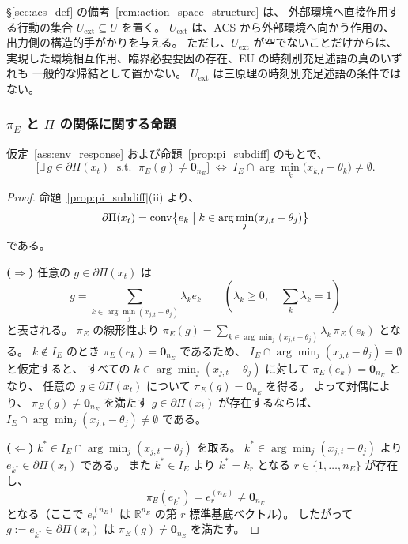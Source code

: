 \begin{remark}
\label{rem:u_ext_output_cue}
\S\ref{sec:acs_def} の備考~\ref{rem:action_space_structure} は、
外部環境へ直接作用する行動の集合 $U_{\mathrm{ext}}\subseteq U$ を置く。
$U_{\mathrm{ext}}$ は、ACS から外部環境へ向かう作用の、
出力側の構造的手がかりを与える。
ただし、$U_{\mathrm{ext}}$ が空でないことだけからは、
実現した環境相互作用、臨界必要要因の存在、EU の時刻別充足述語の真のいずれも
一般的な帰結として置かない。
$U_{\mathrm{ext}}$ は三原理の時刻別充足述語の条件ではない。
\end{remark}

\subsubsection{$\pi_E$ と $\Pi$ の関係に関する命題}

\begin{proposition}
\label{prop:pi_E_sensitivity}
仮定~\ref{ass:env_response} および命題~\ref{prop:pi_subdiff} のもとで、
\[
  \bigl[\exists\,g\in\partial\Pi(x_t)\;\text{ s.t. }\;\pi_E(g)\neq\mathbf{0}_{n_E}\bigr]
  \;\iff\;
  I_E\cap\arg\min_k\bigl(x_{k,t}-\theta_k\bigr)\neq\emptyset.
\]
\end{proposition}

\begin{proof}
命題~\ref{prop:pi_subdiff}(ii) より、
\[
  \partial\Pi(x_t)
  =
  \operatorname{conv}
  \bigl\{
    e_k
    \bigm|
    k\in\arg\min_j(x_{j,t}-\theta_j)
  \bigr\}
\]
である。

\textbf{($\Rightarrow$)}\;
任意の $g\in\partial\Pi(x_t)$ は
\[
  g
  =
  \sum_{k\in\arg\min_j(x_{j,t}-\theta_j)}
  \lambda_k e_k
  \qquad
  (\lambda_k\ge0,\quad \textstyle\sum_k\lambda_k=1)
\]
と表される。
$\pi_E$ の線形性より
$\pi_E(g)=\sum_{k\in\arg\min_j(x_{j,t}-\theta_j)}\lambda_k\,\pi_E(e_k)$
となる。
$k\notin I_E$ のとき $\pi_E(e_k)=\mathbf{0}_{n_E}$ であるため、
$I_E\cap\arg\min_j(x_{j,t}-\theta_j)=\emptyset$ と仮定すると、
すべての $k\in\arg\min_j(x_{j,t}-\theta_j)$ に対して
$\pi_E(e_k)=\mathbf{0}_{n_E}$ となり、
任意の $g\in\partial\Pi(x_t)$ について
$\pi_E(g)=\mathbf{0}_{n_E}$ を得る。
よって対偶により、
$\pi_E(g)\neq\mathbf{0}_{n_E}$ を満たす
$g\in\partial\Pi(x_t)$ が存在するならば、
$I_E\cap\arg\min_j(x_{j,t}-\theta_j)\neq\emptyset$ である。

\textbf{($\Leftarrow$)}\;
$k^*\in I_E\cap\arg\min_j(x_{j,t}-\theta_j)$ を取る。
$k^*\in\arg\min_j(x_{j,t}-\theta_j)$ より
$e_{k^*}\in\partial\Pi(x_t)$ である。
また $k^*\in I_E$ より $k^*=k_r$ となる
$r\in\{1,\ldots,n_E\}$ が存在し、
\[
  \pi_E(e_{k^*})
  =
  e_r^{(n_E)}
  \neq
  \mathbf{0}_{n_E}
\]
となる（ここで $e_r^{(n_E)}$ は
$\mathbb{R}^{n_E}$ の第 $r$ 標準基底ベクトル）。
したがって $g:=e_{k^*}\in\partial\Pi(x_t)$ は
$\pi_E(g)\neq\mathbf{0}_{n_E}$ を満たす。
\end{proof}

